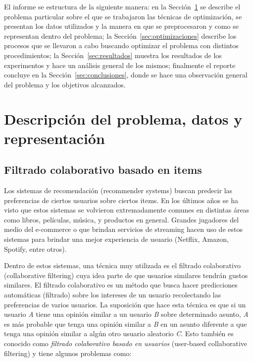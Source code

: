 \documentclass[11pt, a4paper]{article}
\begin{document}
  El informe se estructura de la siguiente manera: en la
  Sección~\ref{sec:problema} se describe el problema particular sobre el que se
  trabajaron las técnicas de optimización, se presentan los datos utilizados y
  la manera en que se preprocesaron y como se representan dentro del problema;
  la Sección~\ref{sec:optimizaciones} describe los procesos que se llevaron a
  cabo buscando optimizar el problema con distintos procedimientos; la
  Sección~\ref{sec:resultados} muestra los resultados de los experimentos y
  hace un análisis general de los mismos; finalmente el reporte concluye en la
  Sección~\ref{sec:conclusiones}, donde se hace una observación general del
  problema y los objetivos alcanzados.
 
  \section{Descripción del problema, datos y representación}\label{sec:problema}

  \subsection{Filtrado colaborativo basado en items}

  Los sistemas de recomendación (recommender systems) buscan predecir las
  preferencias de ciertos usuarios sobre ciertos items. En los últimos años se
  ha visto que estos sistemas se volvieron extremadamente comunes en distintas
  áreas como libros, películas, música, y productos en general. Grandes
  jugadores del medio del e-commerce o que brindan servicios de streaming hacen
  uso de estos sistemas para brindar una mejor experiencia de usuario (Netflix,
  Amazon, Spotify, entre otros).

  Dentro de estos sistemas, una técnica muy utilizada es el filtrado
  colaborativo (collaborative filtering) cuya idea parte de que usuarios
  similares tendrán gustos similares. El filtrado colaborativo es un método que
  busca hacer predicciones automáticas (filtrado) sobre los intereses de un
  usuario recolectando las preferencias de varios usuarios. La suposición que
  hace esta técnica es que si un usuario {\it A} tiene una opinión similar a un
  usuario {\it B} sobre determinado asunto, {\it A} es más probable que tenga
  una opinión similar a {\it B} en un asunto diferente a que tenga una opinión
  similar a algún otro usuario aleatorio {\it C}. Esto también es conocido como
  {\em filtrado colaborativo basado en usuarios} (user-based collaborative
  filtering) y tiene algunos problemas como:
\end{document}
